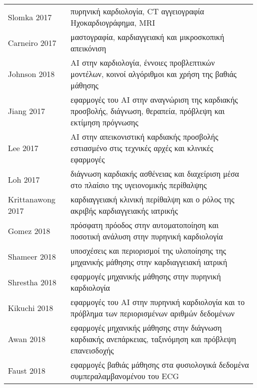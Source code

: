 \begin{sidewaystable}
\begin{tabular}{l l}
		Slomka 2017~\cite{slomka2017cardiac}                & πυρηνική καρδιολογία, CT αγγειογραφία Ηχοκαρδιογράφημα, MRI                                                      \\
		Carneiro 2017~\cite{carneiro2017review}             & μαστογραφία, καρδιαγγειακή και μικροσκοπική απεικόνιση                                                          \\
		Johnson 2018~\cite{johnson2018artificial}           & AI στην καρδιολογία, έννοιες προβλεπτικών μοντέλων, κοινοί αλγόριθμοι και χρήση της βαθιάς μάθησης               \\
		Jiang 2017~\cite{jiang2017artificial}               & εφαρμογές του AI στην αναγνώριση της καρδιακής προσβολής, διάγνωση, θεραπεία, πρόβλεψη και εκτίμηση πρόγνωσης   \\
		Lee 2017~\cite{lee2017deepb}                        & AI στην απεικονιστική καρδιακής προσβολής εστιασμένο στις τεχνικές αρχές και κλινικές εφαρμογές                 \\
		Loh 2017~\cite{loh2017deep}                         & διάγνωση καρδιακής ασθένειας και διαχείριση μέσα στο πλαίσιο της υγειονομικής περίθαλψης                        \\
		Krittanawong 2017~\cite{krittanawong2017artificial} & καρδιαγγειακή κλινική περίθαλψη και ο ρόλος της ακριβής καρδιαγγειακής ιατρικής                                 \\
		Gomez 2018~\cite{gomez2018new}                      & πρόσφατη πρόοδος στην αυτοματοποίηση και ποσοτική ανάλυση στην πυρηνική καρδιολογία                             \\
		Shameer 2018~\cite{shameer2018machine}              & υποσχέσεις και περιορισμοί της υλοποίησης της μηχανικής μάθησης στην καρδιαγγειακή ιατρική                      \\
		Shrestha 2018~\cite{shrestha2018machine}            & εφαρμογές μηχανικής μάθησης στην πυρηνική καρδιολογία                                                           \\
		Kikuchi 2018~\cite{kikuchi2018future}               & εφαρμογές του AI στην πυρηνική καρδιολογία και το πρόβλημα των περιορισμένων αριθμών δεδομένων                  \\
		Awan 2018~\cite{awan2018machine}                    & εφαρμογές μηχανικής μάθησης στην διάγνωση καρδιακής ανεπάρκειας, ταξινόμηση και πρόβλεψη επανεισδοχής           \\
		Faust 2018~\cite{faust2018deep}                     & εφαρμογές βαθιάς μάθησης στα φυσιολογικά δεδομένα συμπεραλαμβανομένου του ECG                                   \\
		\bottomrule
	\end{tabular}
\end{sidewaystable}

